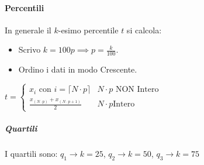 \documentclass[12pt, a4paper, openany]{book}
\begin{document}
\paragraph*{Percentili}
In generale il $k$-esimo percentile $t$ si calcola:
\begin{itemize}
    \item Scrivo $k = 100p \implies p=\frac{k}{100}$.
    \item Ordino i dati in modo Crescente.
\end{itemize}
{$t = 
    \begin{cases}
        x_i \text{ con } i=\lceil N\cdot p \rceil  & N\cdot p\text{ NON Intero}\\
        \frac{x_{(N\cdot p)} + x_{(N\cdot p +1)}}{2}  & N\cdot p \text{Intero}
    \end{cases}$
}
\subparagraph*{Quartili}
I quartili sono: $q_1\to k=25$, $q_2\to k=50$, $q_3 \to k=75$
\end{document}

